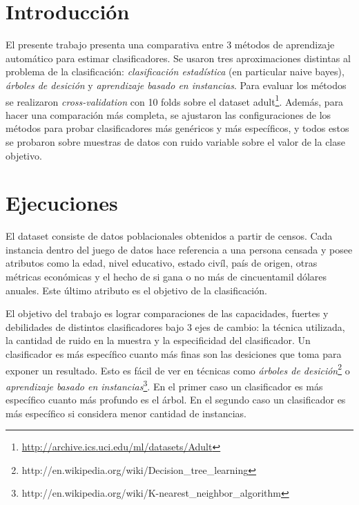 \documentclass[a4paper,10pt]{article}
\begin{document}



\maketitle
\tableofcontents
\newpage

\section{Introducción}

El presente trabajo presenta una comparativa entre 3 métodos de aprendizaje automático para estimar clasificadores. Se usaron tres aproximaciones distintas al problema de la clasificación: \emph{clasificación estadística} (en particular \textsf{naive bayes}), \emph{árboles de desición} y \emph{aprendizaje basado en instancias}. Para evaluar los métodos se realizaron \emph{cross-validation} con 10 folds sobre el dataset \textsf{adult}\footnote{\url{http://archive.ics.uci.edu/ml/datasets/Adult}}. Además, para hacer una comparación más completa, se ajustaron las configuraciones de los métodos para probar clasificadores más genéricos y más específicos, y todos estos se probaron sobre muestras de datos con ruido variable sobre el valor de la clase objetivo. 

\section{Ejecuciones}

El dataset  consiste de datos poblacionales obtenidos a partir de censos. Cada instancia dentro del juego de datos hace referencia a una persona censada y posee atributos como la edad, nivel educativo, estado civíl, país de origen, otras métricas económicas y el hecho de si gana o no más de cincuentamil dólares anuales. Este último atributo es el objetivo de la clasificación.

El objetivo del trabajo es lograr comparaciones de las capacidades, fuertes y debilidades de distintos clasificadores bajo 3 ejes de cambio: la técnica utilizada, la cantidad de ruido en la muestra y la especificidad del clasificador. Un clasificador es más específico cuanto más finas son las desiciones que toma para exponer un resultado. Esto es fácil de ver en técnicas como \emph{árboles de desición}\footnote{http://en.wikipedia.org/wiki/Decision\_tree\_learning} o \emph{aprendizaje basado en instancias}\footnote{http://en.wikipedia.org/wiki/K-nearest\_neighbor\_algorithm}. En el primer caso un clasificador es más específico cuanto más profundo es el árbol. En el segundo caso un clasificador es más específico si considera menor cantidad de instancias.
\end{document}
